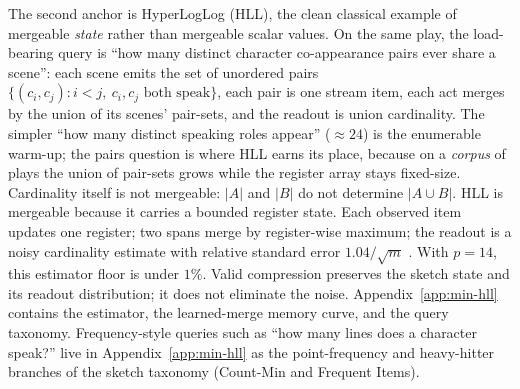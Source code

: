 The second anchor is HyperLogLog (HLL), the clean classical example of
mergeable \emph{state} rather than mergeable scalar values. On the same play,
the load-bearing query is ``how many distinct character co-appearance pairs
ever share a scene'': each scene emits the set of unordered pairs
\(\{(c_i,c_j): i<j,\ c_i,c_j\text{ both speak}\}\), each pair is one stream
item, each act merges by the union of its scenes' pair-sets, and the readout
is union cardinality. The simpler
``how many distinct speaking roles appear'' (\(\approx 24\)) is the
enumerable warm-up; the pairs question is where HLL earns its place, because
on a \emph{corpus} of plays the union of pair-sets grows while the register
array stays fixed-size. Cardinality itself is not mergeable:
\(|A|\) and \(|B|\) do not determine \(|A\cup B|\). HLL is mergeable because
it carries a bounded register state. Each observed item updates one register;
two spans merge by register-wise maximum; the readout is a noisy cardinality
estimate with relative standard error \(1.04/\sqrt{m}\)
\citep{FlajoletEtAl2007,HeuleEtAl2013}. With \(p=14\), this estimator floor is
under \(1\%\). Valid compression preserves the sketch state and its readout
distribution; it does not eliminate the noise. Appendix~\ref{app:min-hll}
contains the estimator, the learned-merge memory curve, and the query
taxonomy. Frequency-style queries such as ``how many lines does a character
speak?'' live in Appendix~\ref{app:min-hll} as the point-frequency and
heavy-hitter branches of the sketch taxonomy (Count-Min and Frequent
Items).

\begin{table}[t]
\centering\small
\setlength{\tabcolsep}{4pt}
\caption{\textbf{The three examples teach three different state requirements.}
Markov-style emotion arcs need ordered boundary state; HLL-style cardinality
under set union needs a compact noisy distinct-presence state; Manifesto
economics needs a learned semantic state that carries both ordered evidence
and measurement noise.}
\label{tab:min-state-alignment}
\end{table}

